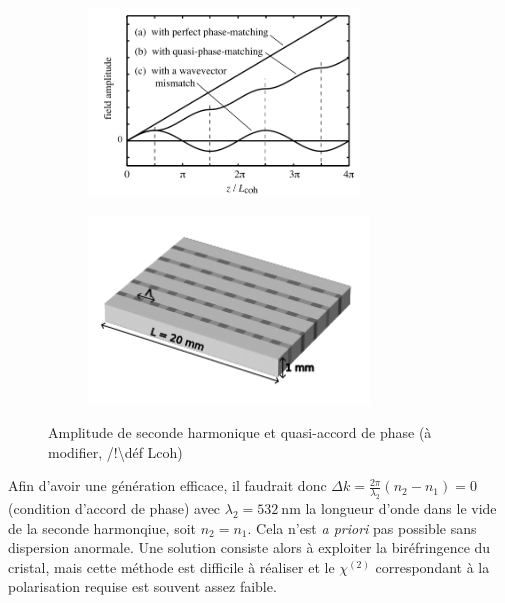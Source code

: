 \documentclass[11pt,a4paper] { article}
\newcommand{\lmbd}[1]{$\SI{#1}{\nano\metre}$}
\begin{document}
\begin{figure}[htpb]
\centering
\begin{subfigure}{0.45\textwidth}
	\centering
	\includegraphics[height=5cm]{./img/QPM.png}
	\caption{}
	\label{fig:agen}
\end{subfigure}
\begin{subfigure}{0.5\textwidth}
	\includegraphics[height=5cm]{./img/cristal.png}
	\caption{}
\end{subfigure}
\hspace*{-0.6cm}
\caption{Amplitude de seconde harmonique et quasi-accord de phase (à modifier, /!\textbackslash déf Lcoh)} %
\label{fig:QPM}
\end{figure}

Afin d'avoir une génération efficace, il faudrait donc $\Delta k = \frac{2\pi}{\lambda_2}(n_2-n_1) = 0$ (condition d'accord de phase) avec $\lambda_2=$\lmbd{532} la longueur d'onde dans le vide de la seconde harmonqiue, soit $n_2 = n_1$. Cela n'est \textit{a priori} pas possible sans dispersion anormale. Une solution consiste alors à exploiter la biréfringence du cristal, mais cette méthode est difficile à réaliser et le $\chi^{(2)}$ correspondant à la polarisation requise est souvent assez faible. 
\end{document}
